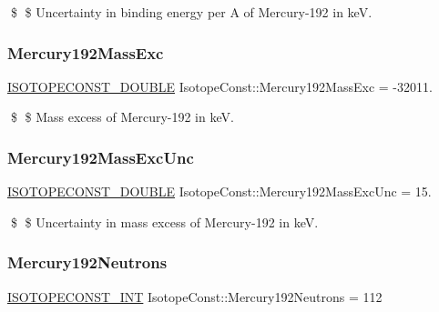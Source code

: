 \$ \$ Uncertainty in binding energy per A of Mercury-\/192 in keV. \mbox{\label{group___isotope_const-_mercury-_hg192_gaef1cfc5491e8f7fabaee9748fba68ba8}} 
\subsubsection{\texorpdfstring{Mercury192\+Mass\+Exc}{Mercury192MassExc}}
{\footnotesize\ttfamily \mbox{\hyperlink{group___isotope_const-_macros_ga8f45a7272ce02c0b4c65c44636ed719a}{I\+S\+O\+T\+O\+P\+E\+C\+O\+N\+S\+T\+\_\+\+D\+O\+U\+B\+LE}} Isotope\+Const\+::\+Mercury192\+Mass\+Exc = -\/32011.}

\$ \$ Mass excess of Mercury-\/192 in keV. \mbox{\label{group___isotope_const-_mercury-_hg192_ga025011c33e089d057b9eaaaf3e4032e7}} 
\subsubsection{\texorpdfstring{Mercury192\+Mass\+Exc\+Unc}{Mercury192MassExcUnc}}
{\footnotesize\ttfamily \mbox{\hyperlink{group___isotope_const-_macros_ga8f45a7272ce02c0b4c65c44636ed719a}{I\+S\+O\+T\+O\+P\+E\+C\+O\+N\+S\+T\+\_\+\+D\+O\+U\+B\+LE}} Isotope\+Const\+::\+Mercury192\+Mass\+Exc\+Unc = 15.}

\$ \$ Uncertainty in mass excess of Mercury-\/192 in keV. \mbox{\label{group___isotope_const-_mercury-_hg192_gae9720a07992e330142883572596fb392}} 
\subsubsection{\texorpdfstring{Mercury192\+Neutrons}{Mercury192Neutrons}}
{\footnotesize\ttfamily \mbox{\hyperlink{group___isotope_const-_macros_ga5f18360b3e99483a35c32d789e62621c}{I\+S\+O\+T\+O\+P\+E\+C\+O\+N\+S\+T\+\_\+\+I\+NT}} Isotope\+Const\+::\+Mercury192\+Neutrons = 112}

